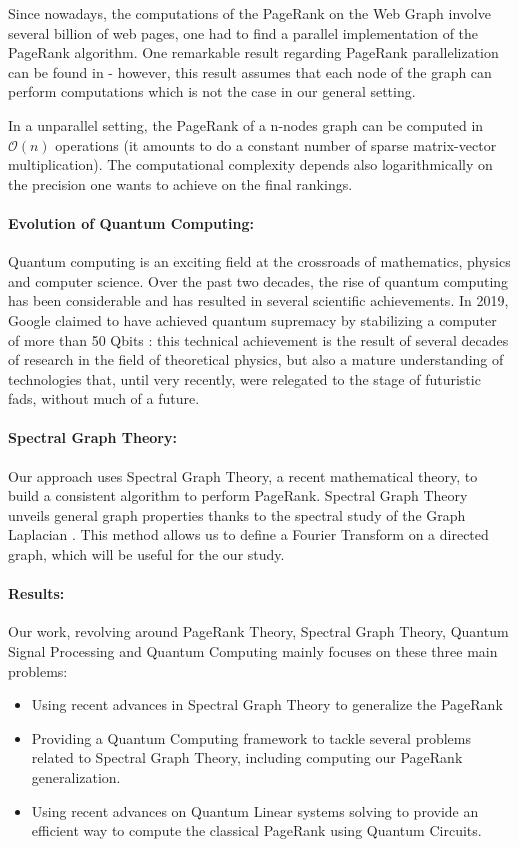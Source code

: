 \documentclass[sn-mathphys]{sn-jnl}%
\theoremstyle{thmstyleone}%
\theoremstyle{thmstyletwo}%
\theoremstyle{thmstylethree}%
\begin{document}
Since nowadays, the computations of the PageRank on the Web Graph
involve several billion of web pages, one had to find a parallel
implementation of the PageRank algorithm. One remarkable result
regarding PageRank parallelization can be found in
\cite{sarma_molla_pandurangan_upfal_2013} - however, this result
assumes that each node of the graph can perform computations which is
not the case in our general setting.

In a unparallel setting, the PageRank of a n-nodes graph can be
computed in $\mathcal{O}(n)$ operations (it amounts to do a constant number of sparse matrix-vector multiplication). The computational complexity depends also logarithmically on the precision one wants to achieve on the final rankings.

\paragraph{Evolution of Quantum Computing:}
Quantum computing is an exciting field at the crossroads of
mathematics, physics and computer science. Over the past two decades,
the rise of quantum computing has been considerable and has resulted
in several scientific achievements. In 2019, Google claimed to have
achieved quantum supremacy by stabilizing a computer of more than 50
Qbits \cite{google2019}: this technical achievement is the result of
several decades of research in the field of theoretical physics, but
also a mature understanding of technologies that, until very recently,
were relegated to the stage of futuristic fads, without much of a
future.

\paragraph{Spectral Graph Theory:}
Our approach uses Spectral Graph Theory, a recent mathematical theory,
to build a consistent algorithm to perform PageRank. Spectral Graph
Theory unveils general graph properties thanks to the spectral study
of the Graph Laplacian \cite{ricaud2019}. This method allows us to
define a Fourier Transform on a directed graph, which will be useful
for the our study.

\paragraph{Results:}
Our work, revolving around PageRank Theory, Spectral Graph Theory, Quantum Signal Processing and Quantum Computing mainly focuses on these three main problems:
\begin{itemize}
    \item Using recent advances in Spectral Graph Theory to generalize the PageRank
    \item Providing a Quantum Computing framework to tackle several problems related to Spectral Graph Theory, including computing our PageRank generalization.
    \item Using recent advances on Quantum Linear systems solving to provide an efficient way to compute the classical PageRank using Quantum Circuits. 
\end{itemize}
\end{document}

